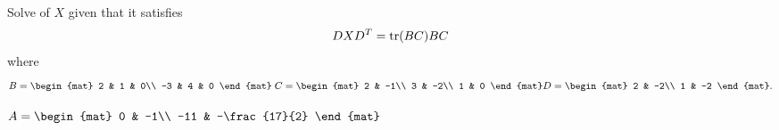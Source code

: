 
\begin{Exercise}[
name={},
title={}, 
difficulty=0,
origin={\cite{YL}}]
Solve of $X$ given that it satisfies
\[
DXD^T = \operatorname{tr}(BC)BC
\]
where
\[
B=
\begin{mat}
2 & 1 & 0\\
-3 & 4 & 0
\end{mat}\;
C=
\begin{mat}
2 & -1\\
3 & -2\\
1 & 0
\end{mat}
D=
\begin{mat}
2 & -2\\
1 & -2
\end{mat}.
\]

\end{Exercise}

\begin{Answer}
$
A=
\begin{mat}
0 & -1\\
-11 & -\frac{17}{2}
\end{mat}
$
\end{Answer}
